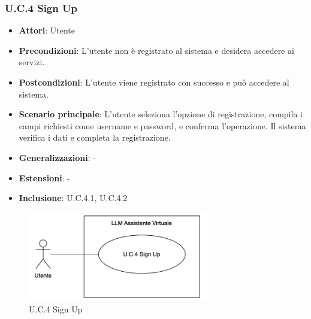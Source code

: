 \subsubsection{U.C.4 Sign Up}
\begin{itemize}
    \item \textbf{Attori}: Utente
    \item \textbf{Precondizioni}: L'utente non è registrato al sistema e desidera accedere ai servizi.
    \item \textbf{Postcondizioni}: L'utente viene registrato con successo e può accedere al sistema.
    \item \textbf{Scenario principale}: L'utente seleziona l'opzione di registrazione, compila i campi richiesti come username e password, e conferma l'operazione. Il sistema verifica i dati e completa la registrazione.
    \item \textbf{Generalizzazioni}: -
    \item \textbf{Estensioni}: -
    \item \textbf{Inclusione}: U.C.4.1, U.C.4.2
\end{itemize}
\begin{figure}[H]
    \centering
    \includegraphics[width=0.7\textwidth]{img/UC4.png}
    \caption{U.C.4 Sign Up}
\end{figure}
\newpage

